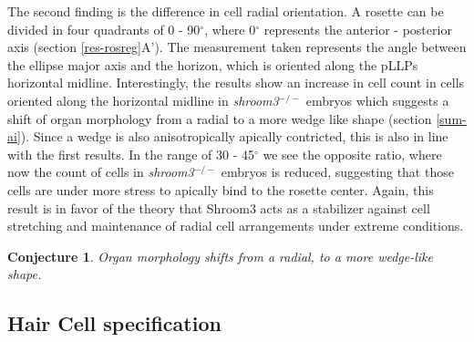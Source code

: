 \documentclass[10pt, b5paper, singlespacinge, twoside]{reedthesis} %
\newtheorem{conjecture}{Conjecture}[chapter]
\theoremstyle{definition}
\theoremstyle{definition}
\theoremstyle{definition}
\theoremstyle{remark}
\begin{document}
The second finding is the difference in cell radial orientation. A rosette can be divided in four quadrants of 0 - 90\(^\circ\), where 0\(^\circ\) represents the anterior - posterior axis (section \ref{res-rosreg}A'). The measurement taken represents the angle between the ellipse major axis and the horizon, which is oriented along the pLLPs horizontal midline. Interestingly, the results show an increase in cell count in cells oriented along the horizontal midline in \emph{shroom3}\(^{-/-}\) embryos which suggests a shift of organ morphology from a radial to a more wedge like shape (section \ref{sum-ai}). Since a wedge is also anisotropically apically contricted, this is also in line with the first results. In the range of 30 - 45\(^\circ\) we see the opposite ratio, where now the count of cells in \emph{shroom3}\(^{-/-}\) embryos is reduced, suggesting that those cells are under more stress to apically bind to the rosette center. Again, this result is in favor of the theory that Shroom3 acts as a stabilizer against cell stretching and maintenance of radial cell arrangements under extreme conditions.
\begin{conjecture}
\protect\hypertarget{cnj:unnamed-chunk-16}{}{\label{cnj:unnamed-chunk-16} }Organ morphology shifts from a radial, to a more wedge-like shape.
\end{conjecture}
\hypertarget{hair-cell-specification}{%
\subsection{Hair Cell specification}\label{hair-cell-specification}}
\end{document}
